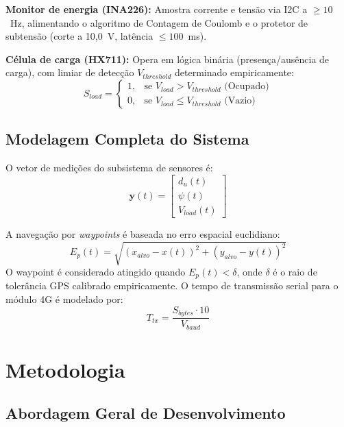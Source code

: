 \documentclass[12pt,a4paper]{article}
\begin{document}
\textbf{Monitor de energia (INA226):} Amostra corrente e tensão via I2C a $\ge 10$~Hz, alimentando o algoritmo de Contagem de Coulomb e o protetor de subtensão (corte a 10{,}0~V, latência $\le 100$~ms).

\textbf{Célula de carga (HX711):} Opera em lógica binária (presença/ausência de carga), com limiar de detecção $V_{threshold}$ determinado empiricamente:
\begin{equation}
S_{load} = \begin{cases} 1, & \text{se } V_{load} > V_{threshold} \text{ (Ocupado)} \\ 0, & \text{se } V_{load} \le V_{threshold} \text{ (Vazio)} \end{cases}
\end{equation}

\subsection{Modelagem Completa do Sistema}

O vetor de medições do subsistema de sensores é:
\begin{equation}
\mathbf{y}(t) = \begin{bmatrix} d_u(t) \\ \psi(t) \\ V_{load}(t) \end{bmatrix}
\end{equation}

A navegação por \textit{waypoints} é baseada no erro espacial euclidiano:
\begin{equation}
E_p(t) = \sqrt{(x_{alvo} - x(t))^2 + (y_{alvo} - y(t))^2}
\end{equation}
O waypoint é considerado atingido quando $E_p(t) < \delta$, onde $\delta$ é o raio de tolerância GPS calibrado empiricamente. O tempo de transmissão serial para o módulo 4G é modelado por:
\begin{equation}
T_{tx} = \frac{S_{bytes} \cdot 10}{V_{baud}}
\end{equation}

\section{Metodologia}

\subsection{Abordagem Geral de Desenvolvimento}
\end{document}
